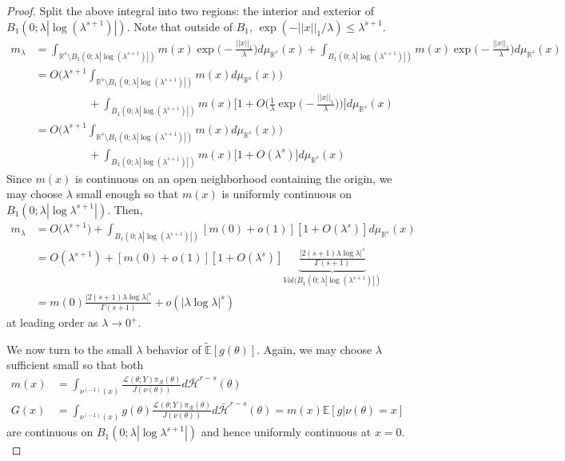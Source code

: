 \documentclass[10pt,fleqn]{article} \pdfoutput=1
\newcommand{\bb}[1]{\mathbb{#1}} \newcommand{\mc}[1]{\mathcal{#1}}
\DeclareMathOperator{\1}{\mathbbm{1}} \DeclareMathOperator{\bigO}{\mc O}
\begin{document}
\begin{proof}
Split the above integral into two regions: the interior and exterior of $B_1(0;\lambda|\log(\lambda^{s+1})|)$. Note that outside of $B_1$, $\exp(-||x||_1/\lambda) \le \lambda^{s+1}.$
\begin{align*}
m_\lambda &= \int_{\mathbb{R}^s \setminus B_1(0;\lambda|\log(\lambda^{s+1})|)}m(x) \exp\bigg(-\frac{||x||_1}{\lambda}\bigg)d\mu_{\mathbb{R}^s}(x) + \int_{B_1(0;\lambda|\log(\lambda^{s+1})|)}m(x) \exp\bigg(-\frac{||x||_1}{\lambda}\bigg)d\mu_{\mathbb{R}^s}(x) \\
&=O\bigg( \lambda^{s+1} \int_{\mathbb{R}^s \setminus B_1(0;\lambda|\log(\lambda^{s+1})|)}m(x) d\mu_{\mathbb{R}^s}(x)\bigg) \\
&\hspace{2cm}+ \int_{B_1(0;\lambda|\log(\lambda^{s+1})|)} m(x) \bigg[1+O\bigg(\frac{1}{\lambda}\exp\bigg(-\frac{||x||_1}{\lambda}\bigg)\bigg)\bigg]d\mu_{\mathbb{R}^s}(x) \\
&=O\bigg( \lambda^{s+1} \int_{\mathbb{R}^s \setminus B_1(0;\lambda|\log(\lambda^{s+1})|)}m(x) d\mu_{\mathbb{R}^s}(x)\bigg) \\
&\hspace{2cm}+ \int_{B_1(0;\lambda|\log(\lambda^{s+1})|)} m(x) \bigg[1+O(\lambda^s) \bigg]d\mu_{\mathbb{R}^s}(x)
\end{align*}
Since $m(x)$ is continuous on an open neighborhood containing the origin, we may choose $\lambda$ small enough so that $m(x)$ is uniformly continuous on $B_1(0;\lambda |\log \lambda^{s+1}|).$ Then, 
\begin{align*}
m_\lambda&= O\bigg( \lambda^{s+1} \bigg) + \int_{B_1(0;\lambda|\log(\lambda^{s+1})|)} [m(0) + o(1)][1+O(\lambda^s)] d\mu_{\mathbb{R}^s} (x) \\
&= O(\lambda^{s+1}) + [m(0)+o(1)][1+ O(\lambda^s)] \underbrace{\frac{|2(s+1)\lambda \log \lambda |^s}{\Gamma(s+1)}}_{Vol(B_1(0;\lambda|\log(\lambda^{s+1})|)}   \\
&= m(0) \frac{|2(s+1)\lambda \log \lambda |^s}{\Gamma(s+1)} + o(|\lambda \log \lambda|^s) 
\end{align*}
at leading order as $\lambda\to 0^+$.


We now turn to the small $\lambda$ behavior of $\tilde{\bb E}[g(\theta)].$  Again, we may choose $\lambda$ sufficient small so that both
\begin{align*}
m(x)&= \int_{\nu^{(-1)}(x)} \frac{\mathcal{L}(\theta;Y)\pi_\mathcal{R}(\theta)}{J(\nu(\theta))} d\bar{\mathcal{H}}^{r-s}(\theta)   \\
G(x)&= \int_{\nu^{(-1)}(x)} g(\theta) \frac{\mathcal{L}(\theta;Y)\pi_\mathcal{R}(\theta)}{J(\nu(\theta))} d\bar{\mathcal{H}}^{r-s}(\theta) =m(x)\bb E[g|\nu(\theta)=x]
\end{align*}
are continuous on $B_1(0;\lambda|\log \lambda^{s+1}|)$ and hence uniformly continuous at $x=0.$ 


\end{proof}
\end{document}
